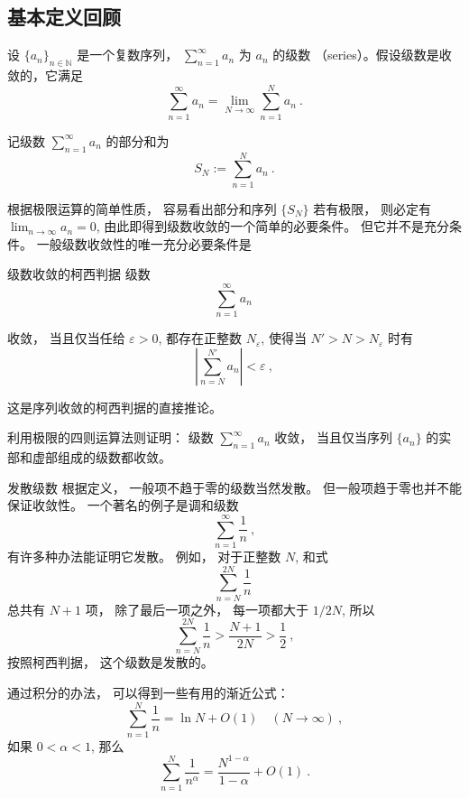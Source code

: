 

\subsection{基本定义回顾}


设 $\{a_n\}_{n\in\mathbb{N}}$ 是一个复数序列， $\sum_{n=1}^\infty a_n$ 为 $a_n$ 的级数 （series）。假设级数是收敛的，它满足
$$
\sum_{n=1}^\infty a_n = \lim_{N \to \infty} \sum_{n=1}^N a_n~.
$$

记级数 $\sum_{n=1}^\infty a_n$ 的部分和为
\[
S_N := \sum_{n=1}^N a_n~.
\]

根据极限运算的简单性质， 容易看出部分和序列 $\{S_N\}$ 若有极限， 则必定有 $\lim_{n\to\infty}a_n=0$, 由此即得到级数收敛的一个简单的必要条件。 但它并不是充分条件。 一般级数收敛性的唯一充分必要条件是
\begin{theorem}{级数收敛的柯西判据}
级数
\begin{equation}
\sum_{n=1}^\infty a_n~
\end{equation}



收敛， 当且仅当任给 $\varepsilon>0$, 都存在正整数 $N_\varepsilon$, 使得当 $N'>N>N_\varepsilon$ 时有
$$
\left|\sum_{n=N}^{N'} a_n\right|<\varepsilon~,
$$
\end{theorem}
这是序列收敛的柯西判据的直接推论。

\begin{exercise}{}
利用极限的四则运算法则证明： 级数 $\sum_{n=1}^\infty a_n$ 收敛， 当且仅当序列 $\{a_n\}$ 的实部和虚部组成的级数都收敛。
\end{exercise}

\begin{example}{发散级数}
根据定义， 一般项不趋于零的级数当然发散。 但一般项趋于零也并不能保证收敛性。 一个著名的例子是调和级数
$$
\sum_{n=1}^\infty\frac{1}{n}~,
$$
有许多种办法能证明它发散。 例如， 对于正整数 $N$, 和式
$$
\sum_{n=N}^{2N}\frac{1}{n}~
$$
总共有 $N+1$ 项， 除了最后一项之外， 每一项都大于 $1/2N$, 所以
$$
\sum_{n=N}^{2N}\frac{1}{n}>\frac{N+1}{2N}>\frac{1}{2}~,
$$
按照柯西判据， 这个级数是发散的。

通过积分的办法， 可以得到一些有用的渐近公式：
$$
\sum_{n=1}^{N}\frac{1}{n}=\ln N+O(1)\quad (N\to\infty)~,
$$
如果 $0<\alpha<1$, 那么
$$
\sum_{n=1}^{N}\frac{1}{n^\alpha}=\frac{N^{1-\alpha}}{1-\alpha}+O(1)~.
$$
\end{example}

